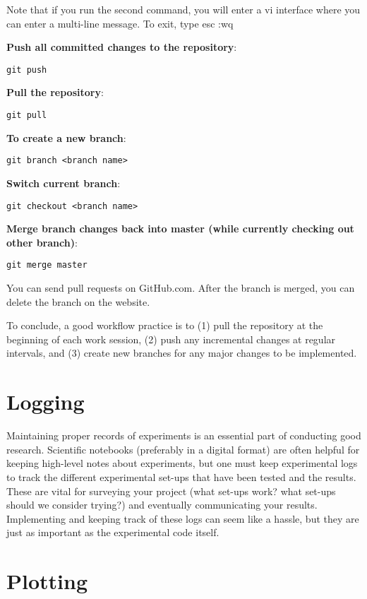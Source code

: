 \noindent Note that if you run the second command, you will enter a vi interface where you can enter a multi-line message. To exit, type esc :wq

\noindent \textbf{Push all committed changes to the repository}:

\begin{lstlisting}[style=python]
git push
\end{lstlisting}

\noindent \textbf{Pull the repository}:

\begin{lstlisting}[style=python]
git pull
\end{lstlisting}

\noindent \textbf{To create a new branch}:

\begin{lstlisting}[style=python]
git branch <branch name>
\end{lstlisting}

\noindent \textbf{Switch current branch}:

\begin{lstlisting}[style=python]
git checkout <branch name>
\end{lstlisting}

\noindent \textbf{Merge branch changes back into master (while currently checking out other branch)}:

\begin{lstlisting}[style=python]
git merge master
\end{lstlisting}

\noindent You can send pull requests on GitHub.com. After the branch is merged, you can delete the branch on the website.
\newline

\noindent To conclude, a good workflow practice is to (1) pull the repository at the beginning of each work session, (2) push any incremental changes at regular intervals, and (3) create new branches for any major changes to be implemented.

\section{Logging}

Maintaining proper records of experiments is an essential part of conducting good research. Scientific notebooks (preferably in a digital format) are often helpful for keeping high-level notes about experiments, but one must keep experimental logs to track the different experimental set-ups that have been tested and the results. These are vital for surveying your project (what set-ups work? what set-ups should we consider trying?) and eventually communicating your results. Implementing and keeping track of these logs can seem like a hassle, but they are just as important as the experimental code itself.



\section{Plotting}

